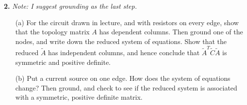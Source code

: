 \documentclass{article}
\begin{document}
\noindent \textbf{2.} \textit{Note: I suggest grounding as the last step.}

\begin{itemize}
    \item[(a)] For the circuit drawn in lecture, and with resistors on every edge, show that the topology matrix $A$ has dependent columns. Then ground one of the nodes, and write down the reduced system of equations. Show that the reduced $\tilde{A}$ has independent columns, and hence conclude that $\tilde{A}^T \tilde{C} \tilde{A}$ is symmetric and positive definite.
    \item[(b)] Put a current source on one edge. How does the system of equations change? Then ground, and check to see if the reduced system is associated with a symmetric, positive definite matrix.
\end{itemize}
\end{document}
